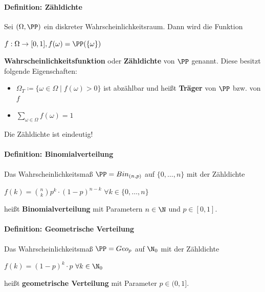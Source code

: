 \paragraph{Definition: Zähldichte}
Sei $(\Omega,\PP)$ ein diskreter Wahrscheinlichkeitsraum.
Dann wird die Funktion
\begin{tightcenter}
	$f:\Omega\rightarrow[0,1], f(\omega)=\PP(\{\omega\})$
\end{tightcenter}
\textbf{Wahrscheinlichkeitsfunktion} oder \textbf{Zähldichte} von $\PP$ genannt.
\newpage
Diese besitzt folgende Eigenschaften:
\begin{itemize}
	\item $\Omega_T\coloneqq\{\omega\in\Omega\mid f(\omega)>0\}$ ist abzählbar und heißt \textbf{Träger} von $\PP$ bzw. von $f$
	\item $\sum\limits_{\omega\in\Omega}f(\omega)=1$
\end{itemize}
Die Zähldichte ist eindeutig!

\paragraph{Definition: Binomialverteilung}
Das Wahrscheinlichkeitsmaß $\PP=Bin_{(n,p)}$ auf $\{0,\ldots,n\}$ mit der Zähldichte
\begin{tightcenter}
	$f(k)=\binom{n}{k}p^k\cdot(1-p)^{n-k}$ \qquad$\forall k\in\{0,\ldots,n\}$
\end{tightcenter}
heißt \textbf{Binomialverteilung} mit Parametern $n\in\N$ und $p\in[0,1]$.

\paragraph{Definition: Geometrische Verteilung}
Das Wahrscheinlichkeitsmaß $\PP=Geo_p$ auf $\N_0$ mit der Zähldichte
\begin{tightcenter}
	$f(k)=(1-p)^k\cdot p$ \qquad$\forall k\in\N_0$
\end{tightcenter}
heißt \textbf{geometrische Verteilung} mit Parameter $p\in(0,1]$.
